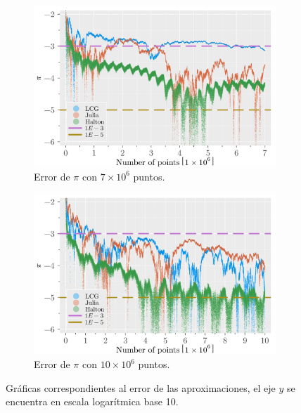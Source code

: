 \begin{enumerate}
\begin{solution}
\begin{figure}
\begin{subfigure}{0.45\textwidth}
                \centering
                \includegraphics[scale=0.065]{../figures/error_7E6.png}
                \caption{Error de $\pi$ con $7 \times 10^6$ puntos.}
                \label{fig:pi_error_7e6}
            \end{subfigure}
            \hfill
            \begin{subfigure}{0.45\textwidth}
                \centering
                \includegraphics[scale=0.065]{../figures/error_10E6.png}
                \caption{Error de $\pi$ con $10 \times 10^6$ puntos.}
                \label{fig:pi_error_10e6}
            \end{subfigure}
            \caption{Gráficas correspondientes al error de las aproximaciones, el eje $y$ se encuentra en escala logarítmica base 10.}
            \label{fig:pi_errors}
        \end{figure}
    \end{solution}
\end{enumerate}

